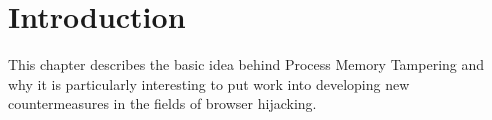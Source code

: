 \section{Introduction}
\label{sec:introduction}
This chapter describes the basic idea behind Process Memory Tampering and why it is particularly interesting to put work into developing new countermeasures in the fields of browser hijacking.






